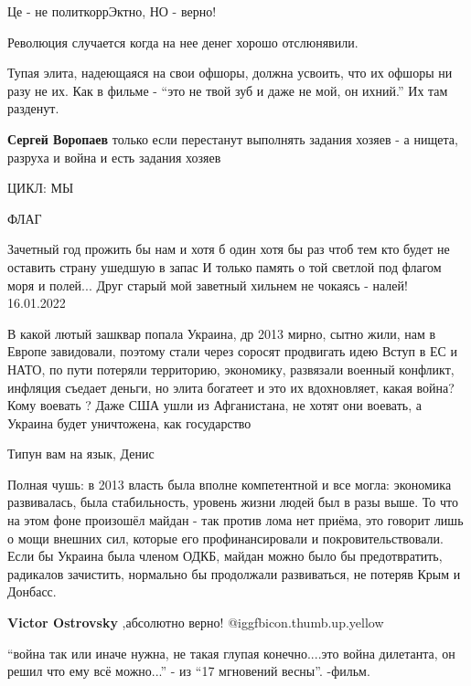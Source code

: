\begin{itemize}
\begin{itemize}
Це - не политкоррЭктно, НО - верно!
\end{itemize} %

Революция случается когда на нее денег хорошо отслюнявили.


Тупая элита, надеющаяся на свои офшоры, должна усвоить, что их офшоры ни
разу не их. Как в фильме - \enquote{это не твой зуб и даже не мой, он ихний.} Их
там разденут.

\textbf{Сергей Воропаев} только если перестанут выполнять задания хозяев - а нищета, разруха и война и есть задания хозяев

ЦИКЛ: МЫ

ФЛАГ

\obeycr
Зачетный год прожить бы нам и
хотя б один хотя бы раз
чтоб тем кто будет не оставить
страну ушедшую в запас
И только память о той светлой
под флагом моря и полей...
Друг старый мой заветный
хильнем не чокаясь - налей!
16.01.2022
\restorecr


В какой лютый зашквар попала Украина, др 2013 мирно, сытно жили, нам в Европе
завидовали, поэтому стали через соросят продвигать идею Вступ в ЕС и НАТО, по
пути потеряли территорию, экономику, развязали военный конфликт, инфляция
съедает деньги, но элита богатеет и это их вдохновляет, какая война? Кому
воевать ? Даже США ушли из Афганистана, не хотят они воевать, а Украина будет
уничтожена, как государство

Типун вам на язык, Денис


Полная чушь: в 2013 власть была вполне компетентной и все могла: экономика
развивалась, была стабильность, уровень жизни людей был в разы выше. То что на
этом фоне произошёл майдан - так против лома нет приёма, это говорит лишь о
мощи внешних сил, которые его профинансировали и покровительствовали. Если бы
Украина была членом ОДКБ, майдан можно было бы предотвратить, радикалов
зачистить, нормально бы продолжали развиваться, не потеряв Крым и Донбасс.

\textbf{Victor Ostrovsky} ,абсолютно верно! @igg{fbicon.thumb.up.yellow} 


\enquote{война так или иначе нужна, не такая глупая конечно....это война дилетанта, он
решил что ему всё можно...} - из \enquote{17 мгновений весны}. -фильм.


\end{itemize}
